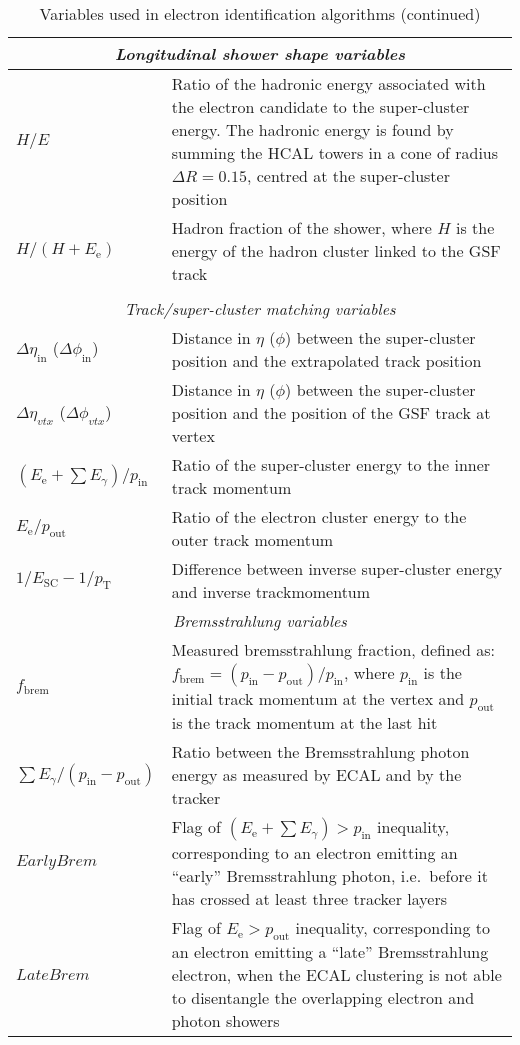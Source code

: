 \begin{longtable}{| p{} | p{} |}
  \multicolumn{2}{|c|}{\textit{Longitudinal shower shape variables}} \\
  \midrule
  $H/E$ & Ratio of the hadronic energy associated with the electron candidate to the super-cluster energy. The hadronic energy is found by summing the HCAL towers in a cone of radius $\Delta R = 0.15$, centred at the super-cluster position\\
  \midrule
  $H/(H+E_\text{e})$ & Hadron fraction of the shower, where $H$ is the energy of the hadron cluster linked to
  the GSF track\\
  \midrule

  \caption{Variables used in electron identification algorithms (continued)} \\
  \midrule


  \multicolumn{2}{|c|}{\textit{Track/super-cluster matching variables}} \\
  \midrule
  $\Delta\eta_{\text{in}}$ ($\Delta\phi_{\text{in}}$) & Distance in $\eta$ ($\phi$) between the super-cluster
  position and the extrapolated track position \\
  \midrule
  $\Delta\eta_{vtx}$ ($\Delta\phi_{vtx}$) & Distance in $\eta$ ($\phi$) between the super-cluster
  position and the position of the GSF track at vertex \\
  \midrule
  $(E_\text{e}+\sum E_\gamma)/p_\text{in}$ & Ratio of the super-cluster energy to the inner track
  momentum\\
  \midrule
  $E_\text{e}/p_\text{out}$ & Ratio of the electron cluster energy to the outer track momentum\\
  \midrule
  $1/E_\text{SC} - 1/p_\text{T}$ & Difference between inverse super-cluster energy and inverse
  track\newline momentum\\
  \midrule

  \multicolumn{2}{|c|}{\textit{Bremsstrahlung variables}} \\
  \midrule
  $f_\text{brem}$ & Measured bremsstrahlung fraction, defined as:
  $f_\text{brem} = (p_\text{in}-p_\text{out})/p_\text{in}$, where $p_\text{in}$ is the initial track momentum at the vertex and $p_\text{out}$ is the track momentum at the last hit\\
  \midrule
  $\sum E_\gamma/(p_\text{in}-p_\text{out})$ & Ratio between the Bremsstrahlung photon energy as measured by
  ECAL and by the tracker\\
  \midrule
  $EarlyBrem$ & Flag of $(E_\text{e}+\sum E_\gamma)>p_\text{in}$ inequality, corresponding to an electron
  emitting an ``early'' Bremsstrahlung photon, i.e.\ before it has crossed at least three tracker layers\\
  \midrule
  $LateBrem$ & Flag of $E_\text{e}>p_\text{out}$ inequality, corresponding to an electron emitting a ``late''
  Bremsstrahlung electron, when the ECAL clustering is not able to disentangle the overlapping electron and photon
  showers\\

  \bottomrule
\end{longtable}
